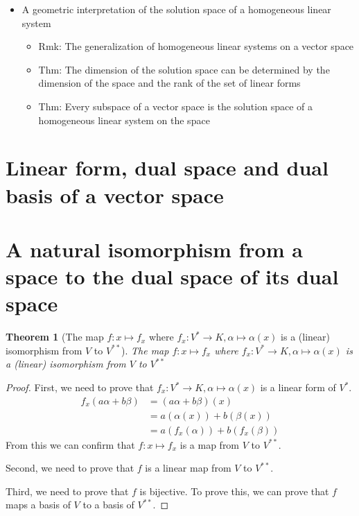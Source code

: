\documentclass[onecolumn]{ctexart}
\newtheorem{theorem}{Theorem}
\begin{document}
\begin{itemize}
\begin{itemize}
\begin{itemize}
    \end{itemize}
    \item Thm: The dimension of the annihilator in terms of the dimension of the space and the subspace
    \item Thm: The annihilator of the annihilator of a subspace give rise to the subspace itself under the isomorphism
    \item Cor: The correspondence between subspaces of a space and subspaces of its dual space in terms of annihilators
  \end{itemize}
  \item A geometric interpretation of the solution space of a homogeneous linear system
  \begin{itemize}
    \item Rmk: The generalization of homogeneous linear systems on a vector space
    \item Thm: The dimension of the solution space can be determined by the dimension of the space and the rank of the set of linear forms
    \item Thm: Every subspace of a vector space is the solution space of a homogeneous linear system on the space
  \end{itemize}
\end{itemize}

\section{Linear form, dual space and dual basis of a vector space}

\section{A natural isomorphism from a space to the dual space of its dual space}

\begin{theorem}[The map $f: x \mapsto f_x$ where $f_x: V^* \to K, \alpha \mapsto \alpha(x)$ is a (linear) isomorphism from $V$ to $V^{**}$]
  The map $f: x \mapsto f_x$ where $f_x: V^* \to K, \alpha \mapsto \alpha(x)$ is a (linear) isomorphism from $V$ to $V^{**}$
\end{theorem}
\begin{proof}
  First, we need to prove that $f_x: V^* \to K, \alpha \mapsto \alpha(x)$ is a linear form of $V^*$.
  \[
    \begin{split}
      f_x(a \alpha + b \beta) &= (a \alpha + b \beta)(x) \\
                              &= a(\alpha(x)) + b(\beta(x)) \\
                              &= a(f_x(\alpha)) + b(f_x(\beta))
    \end{split}
  \]
  From this we can confirm that $f: x \mapsto f_x$ is a map from $V$ to $V^{**}$.

  Second, we need to prove that $f$ is a linear map from $V$ to $V^{**}$.

  Third, we need to prove that $f$ is bijective. To prove this, we can prove that $f$ maps a basis of $V$ to a basis of $V^{**}$.
\end{proof}
\end{document}
